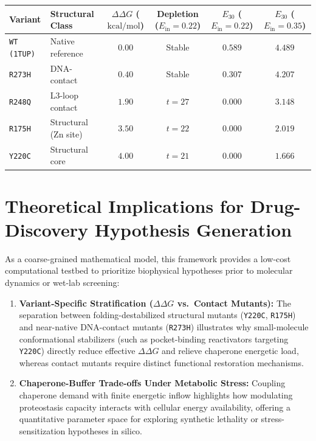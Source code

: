 \documentclass[11pt,a4paper]{article}
\begin{document}
\begin{center}
\small
\begin{tabular}{llcccc}
\toprule
\textbf{Variant} & \textbf{Structural Class} & $\Delta\Delta G$ ($\mathrm{kcal/mol}$) & \textbf{Depletion ($E_{\mathrm{in}}=0.22$)} & $E_{30}$ ($E_{\mathrm{in}}=0.22$) & $E_{30}$ ($E_{\mathrm{in}}=0.35$) \\
\midrule
\texttt{WT (1TUP)} & Native reference & $0.00$ & Stable & $0.589$ & $4.489$ \\
\texttt{R273H} & DNA-contact & $0.40$ & Stable & $0.307$ & $4.207$ \\
\texttt{R248Q} & L3-loop contact & $1.90$ & $t = 27$ & $0.000$ & $3.148$ \\
\texttt{R175H} & Structural (Zn site) & $3.50$ & $t = 22$ & $0.000$ & $2.019$ \\
\texttt{Y220C} & Structural core & $4.00$ & $t = 21$ & $0.000$ & $1.666$ \\
\bottomrule
\end{tabular}
\end{center}

\section{Theoretical Implications for Drug-Discovery Hypothesis Generation}
As a coarse-grained mathematical model, this framework provides a low-cost computational testbed to prioritize biophysical hypotheses prior to molecular dynamics or wet-lab screening:
\begin{enumerate}
  \item \textbf{Variant-Specific Stratification ($\Delta\Delta G$ vs.\ Contact Mutants):} The separation between folding-destabilized structural mutants (\texttt{Y220C}, \texttt{R175H}) and near-native DNA-contact mutants (\texttt{R273H}) illustrates why small-molecule conformational stabilizers (such as pocket-binding reactivators targeting \texttt{Y220C}) directly reduce effective $\Delta\Delta G$ and relieve chaperone energetic load, whereas contact mutants require distinct functional restoration mechanisms.
  \item \textbf{Chaperone-Buffer Trade-offs Under Metabolic Stress:} Coupling chaperone demand with finite energetic inflow highlights how modulating proteostasis capacity interacts with cellular energy availability, offering a quantitative parameter space for exploring synthetic lethality or stress-sensitization hypotheses in silico.
\end{enumerate}
\end{document}
